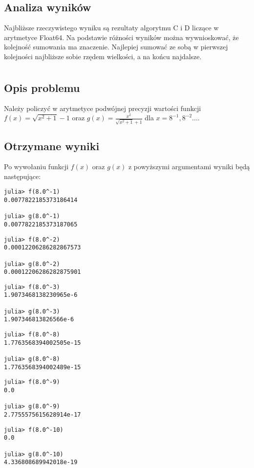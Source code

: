 \documentclass[11pt]{article}
\theoremstyle{remark}
\begin{document}
\subsection{Analiza wyników}
Najbliższe rzeczywistego wyniku są rezultaty algorytmu C i D liczące w arytmetyce Float64. Na podstawie różności wyników można wywnioskować, że kolejność sumowania ma znaczenie. Najlepiej sumować ze sobą w pierwszej kolejności najbliższe sobie rzędem wielkości, a na końcu najdalsze.
\section{}
\subsection{Opis problemu}
Należy policzyć w arytmetyce podwójnej precyzji wartości funkcji $f(x)=\sqrt{x^2+1}-1$ oraz $g(x)=\frac{x^2}{\sqrt{x^2+1}+1}$ dla $x=8^{-1}, 8^{-2} ...$. 
\subsection{Otrzymane wyniki}
Po wywołaniu funkcji $f(x)$ oraz $g(x)$ z powyższymi argumentami wyniki będą następujące:

\begin{lstlisting}[style=BashStyle]
julia> f(8.0^-1)
0.0077822185373186414

julia> g(8.0^-1)
0.0077822185373187065
\end{lstlisting}
\begin{lstlisting}[style=BashStyle]
julia> f(8.0^-2)
0.00012206286282867573

julia> g(8.0^-2)
0.00012206286282875901
\end{lstlisting}
\begin{lstlisting}[style=BashStyle]
julia> f(8.0^-3)
1.9073468138230965e-6

julia> g(8.0^-3)
1.907346813826566e-6
\end{lstlisting}
\begin{lstlisting}[style=BashStyle]
julia> f(8.0^-8)
1.7763568394002505e-15

julia> g(8.0^-8)
1.7763568394002489e-15
\end{lstlisting}
\begin{lstlisting}[style=BashStyle]
julia> f(8.0^-9)
0.0

julia> g(8.0^-9)
2.7755575615628914e-17
\end{lstlisting}
\begin{lstlisting}[style=BashStyle]
julia> f(8.0^-10)
0.0

julia> g(8.0^-10)
4.336808689942018e-19
\end{lstlisting}
\end{document}
